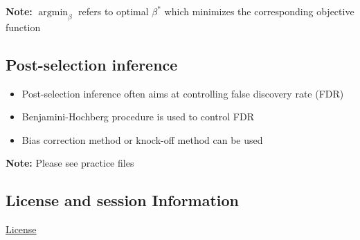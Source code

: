 \documentclass[]{article}
\begin{document}
\textbf{Note:} \(\operatorname*{argmin}_{\beta}\) refers to optimal
\(\beta^{\ast}\) which minimizes the corresponding objective function

\subsection{Post-selection inference}\label{post-selection-inference-1}

\begin{itemize}
\item
  Post-selection inference often aims at controlling false discovery
  rate (FDR)
\item
  Benjamini-Hochberg procedure is used to control FDR
\item
  Bias correction method or knock-off method can be used
\end{itemize}

\textbf{Note:} Please see practice files

\subsection{License and session
Information}\label{license-and-session-information}

\href{http://math.wsu.edu/faculty/xchen/stat412/LICENSE.html}{License}
\end{document}

